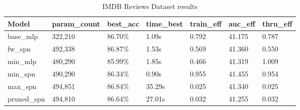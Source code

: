 \begin{table}[h!]
    \centering
    \caption{IMDB Reviews Dataset results}
    \begin{tabular}{|l|l|l|l|l|l|l|}
    \hline
    \textbf{Model} & \textbf{param\_count} & \textbf{best\_acc} & \textbf{time\_best} & \textbf{train\_eff} & \textbf{auc\_eff} & \textbf{thru\_eff} \\
    \hline
    base\_mlp & 322,210 & 86.70\% & 1.09s & 0.792 & \cellcolor{red!25}41.175 & 0.787 \\
    fw\_spn & 492,338 & \cellcolor{green!25}86.87\% & 1.53s & 0.569 & 41.360 & 0.550 \\
    min\_mlp & 480,290 & \cellcolor{red!25}85.99\% & 1.85s & 0.466 & 41.319 & \cellcolor{green!25}1.009 \\
    min\_spn & 490,290 & 86.34\% & \cellcolor{green!25}0.90s & \cellcolor{green!25}0.955 & \cellcolor{green!25}41.455 & 0.954 \\
    max\_spn & 494,851 & 86.84\% & \cellcolor{red!25}35.29s & \cellcolor{red!25}0.025 & 41.340 & \cellcolor{red!25}0.025 \\
    pruned\_spn & 494,810 & 86.64\% & 27.01s & 0.032 & 41.255 & 0.032 \\
    \hline
    \end{tabular}
    \label{tab:imdbResults}
\end{table}

